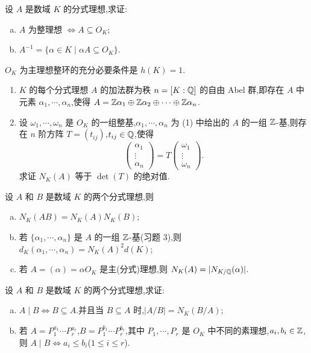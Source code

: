 \begin{Exercises}
  \item 设 $A$ 是数域 $K$ 的分式理想,求证:
  \begin{enumerate}[(a)]
    \item $A$ 为整理想 $\Leftrightarrow A\subseteq O_K$;
    \item $A^{-1}=\{\alpha\in K\mid\alpha A\subseteq O_K\}$.
  \end{enumerate}
  \item $O_K$ 为主理想整环的充分必要条件是 $h(K)=1$.
  \item \begin{enumerate}[(1)]
    \item $K$ 的每个分式理想 $A$ 的加法群为秩 $n=[K:\mathbb{Q}]$ 的自由 Abel 群,即存在 $A$ 中元素 $\alpha_1,\cdots,\alpha_n$,使得 $A=\mathbb{Z}\alpha_1\oplus\mathbb{Z}\alpha_2\oplus\cdots\oplus\mathbb{Z}\alpha_n$.
    \item 设 $\omega_1,\cdots,\omega_n$ 是 $O_K$ 的一组整基,$\alpha_1,\cdots,\alpha_n$ 为 (1) 中给出的 $A$ 的一组 $\mathbb{Z}$-基,则存在 $n$ 阶方阵 $T=(t_{ij})$,$t_{ij}\in\mathbb{Q}$,使得
    \[
      \begin{pmatrix}\alpha_1\\ \vdots\\ \alpha_n\end{pmatrix}
      =T\begin{pmatrix}\omega_1\\ \vdots\\ \omega_n\end{pmatrix}.
    \]
    求证 $N_K(A)$ 等于 $\det(T)$ 的绝对值.
  \end{enumerate}
  \item 设 $A$ 和 $B$ 是数域 $K$ 的两个分式理想,则
  \begin{enumerate}[(a)]
    \item $N_K(AB)=N_K(A)N_K(B)$;
    \item 若 $\{\alpha_1,\cdots,\alpha_n\}$ 是 $A$ 的一组 $\mathbb{Z}$-基(习题 3),则 $d_K(\alpha_1,\cdots,\alpha_n)=N_K(A)^2d(K)$;
    \item 若 $A=(\alpha)=\alpha O_K$ 是主(分式)理想,则 $N_K(A)=|N_{K/\mathbb{Q}}(\alpha)|$.
  \end{enumerate}
  \item 设 $A$ 和 $B$ 是数域 $K$ 的两个分式理想,求证:
  \begin{enumerate}[(a)]
    \item $A\mid B\Leftrightarrow B\subseteq A$.并且当 $B\subseteq A$ 时,$|A/B|=N_K(B/A)$;
    \item 若 $A=P_1^{a_1}\cdots P_r^{a_r}$,$B=P_1^{b_1}\cdots P_r^{b_r}$,其中 $P_1,\cdots,P_r$ 是 $O_K$ 中不同的素理想,$a_i,b_i\in\mathbb{Z}$,则 $A\mid B\Leftrightarrow a_i\leqslant b_i$($1\leqslant i\leqslant r$).

\end{enumerate}
\end{Exercises}
